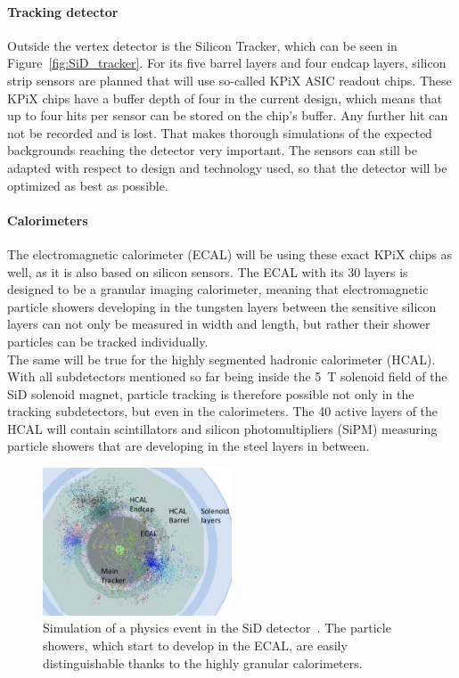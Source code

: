\paragraph{Tracking detector}
Outside the vertex detector is the Silicon Tracker, which can be seen in Figure~\ref{fig:SiD_tracker}.
For its five barrel layers and four endcap layers, silicon strip sensors are planned that will use so-called KPiX ASIC readout chips.
These KPiX chips have a buffer depth of four in the current design, which means that up to four hits per sensor can be stored on the chip's buffer.
Any further hit can not be recorded and is lost.
That makes thorough simulations of the expected backgrounds reaching the detector very important.
The sensors can still be adapted with respect to design and technology used, so that the detector will be optimized as best as possible.

\paragraph{Calorimeters}
The electromagnetic calorimeter (ECAL) will be using these exact KPiX chips as well, as it is also based on silicon sensors.
The ECAL with its 30 layers is designed to be a granular imaging calorimeter, meaning that electromagnetic particle showers developing in the tungsten layers between the sensitive silicon layers can not only be measured in width and length, but rather their shower particles can be tracked individually.
\\The same will be true for the highly segmented hadronic calorimeter (HCAL).
With all subdetectors mentioned so far being inside the \SI{5}{\tesla} solenoid field of the SiD solenoid magnet, particle tracking is therefore possible not only in the tracking subdetectors, but even in the calorimeters.
The 40 active layers of the HCAL will contain scintillators and silicon photomultipliers (SiPM) measuring particle showers that are developing in the steel layers in between.
\begin{figure}[h!]
\centering
\includegraphics[width=0.5\textwidth]{Figures/SiD_PFA.png}
\caption[Visualization of the granulat SiD subdetectors]{Simulation of a physics event in the SiD detector~\cite{SiD_Update2}.
The particle showers, which start to develop in the ECAL, are easily distinguishable thanks to the highly granular calorimeters.}
\label{fig:SiD_PFA}
\end{figure}

